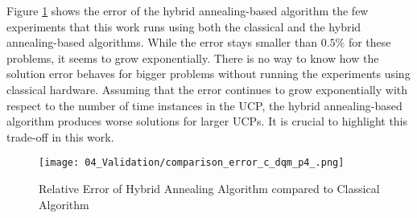 Figure \ref{figure:evaluation.comparison.error} shows the error of the hybrid annealing-based algorithm the few experiments that this work runs using both the classical and the hybrid annealing-based algorithms.
While the error stays smaller than $0.5\%$ for these problems, it seems to grow exponentially.
There is no way to know how the solution error behaves for bigger problems without running the experiments using classical hardware.
Assuming that the error continues to grow exponentially with respect to the number of time instances in the UCP, the hybrid annealing-based algorithm produces worse solutions for larger UCPs.
It is crucial to highlight this trade-off in this work.

\begin{figure}
  \centering
  \texttt{[image: 04\_Validation/comparison\_error\_c\_dqm\_p4\_.png]}
  \caption{Relative Error of Hybrid Annealing Algorithm compared to Classical Algorithm}
  \label{figure:evaluation.comparison.error}
\end{figure}
